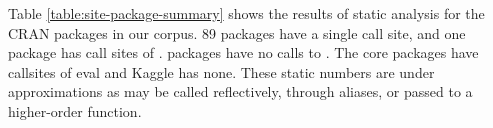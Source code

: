 \documentclass[conference]{IEEEtran}
\newcommand{\missingNumber}{\textcolor{red}{XX}\xspace}
\newcommand{\missingPercentage}{\textcolor{red}{XX\%}\xspace}
\begin{document}



Table \ref{table:site-package-summary} shows the results of static analysis
for the CRAN packages in our corpus. 89 packages have a single call site,
and one package has  call sites of \eval.  packages have
no calls to \eval. The core packages have  callsites of eval and
Kaggle has none. These static numbers are under approximations as \eval may
be called reflectively, through aliases, or passed to a higher-order function.
\end{document}
